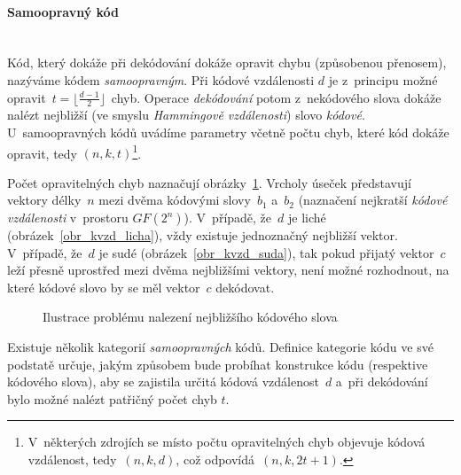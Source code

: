 \documentclass[thesis=M,czech,hidelinks]{FITthesis}[2012/06/26]
\newcommand{\0}{{\textcolor[gray]{0.75}{0}}}
\begin{document}
\paragraph{Samoopravný kód} \hfil \\
Kód, který dokáže při dekódování dokáže opravit chybu (způsobenou přenosem),
nazýváme kódem \emph{samoopravným}. Při kódové vzdálenosti $d$ je z~principu
možné opravit~$t = \lfloor \frac{d-1}{2} \rfloor$~chyb. Operace
\emph{dekódování} potom z~nekódového slova dokáže nalézt nejbližší (ve smyslu
\emph{Hammingově vzdálenosti}) slovo \emph{kódové}. U~samoopravných kódů uvádíme
parametry včetně počtu chyb, které kód dokáže opravit, tedy $(n,k,t)$\footnote{
    V~některých zdrojích se místo počtu opravitelných chyb objevuje kódová
    vzdálenost, tedy~$(n,k,d)$, což odpovídá~$(n,k,2t+1)$.
}.


Počet opravitelných chyb naznačují obrázky~\ref{obr_kvzd}. Vrcholy úseček
představují vektory délky~$n$ mezi dvěma kódovými slovy~$b_1$ a~$b_2$ (naznačení
nejkratší \emph{kódové vzdálenosti} v~prostoru $GF(2^n)$). V~případě, že~$d$ je
liché (obrázek~\ref{obr_kvzd_licha}), vždy existuje jednoznačný nejbližší
vektor. V~případě, že~$d$ je sudé (obrázek~\ref{obr_kvzd_suda}), tak pokud
přijatý vektor~$c$ leží přesně uprostřed mezi dvěma nejbližšími vektory, není
možné rozhodnout, na které kódové slovo by se měl vektor~$c$ dekódovat.

\begin{figure}
    \centering
    \quad
    \caption{Ilustrace problému nalezení nejbližšího kódového slova \label{obr_kvzd}}
\end{figure}

Existuje několik kategorií \emph{samoopravných} kódů. Definice kategorie kódu ve
své podstatě určuje, jakým způsobem bude probíhat konstrukce kódu (respektive
kódového slova), aby se zajistila určitá kódová vzdálenost~$d$ a~při dekódování
bylo možné nalézt patřičný počet chyb $t$.
\end{document}
